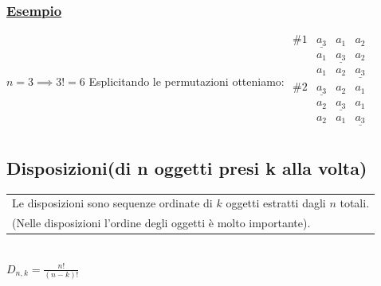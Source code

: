 \documentclass{article}
\begin{document}
\subsubsection{\underline{Esempio}}
$n = 3 \implies 3! = 6$ 
Esplicitando le permutazioni otteniamo: $\begin{matrix}

\#1 & \underline{a_3} & a_1 & a_2 \\
& a_1 & \underline{a_3} & a_2 \\
& a_1 & a_2 & \underline{a_3} \\

\#2 & \underline{a_3} & a_2 & a_1\\
& a_2 & \underline{a_3} & a_1 \\
& a_2 & a_1 & \underline{a_3} \\

\end{matrix}$ \\


\subsection{Disposizioni(di n oggetti presi k alla volta)}

\begin{tabular}{|p{13cm}}
Le disposizioni sono sequenze ordinate di $k$ oggetti estratti dagli $n$ totali. \\
(Nelle disposizioni l’ordine degli oggetti è molto importante).
\end{tabular}
\\
$D_{n,k} = \frac{n!}{(n-k)!}$
\\
\end{document}
